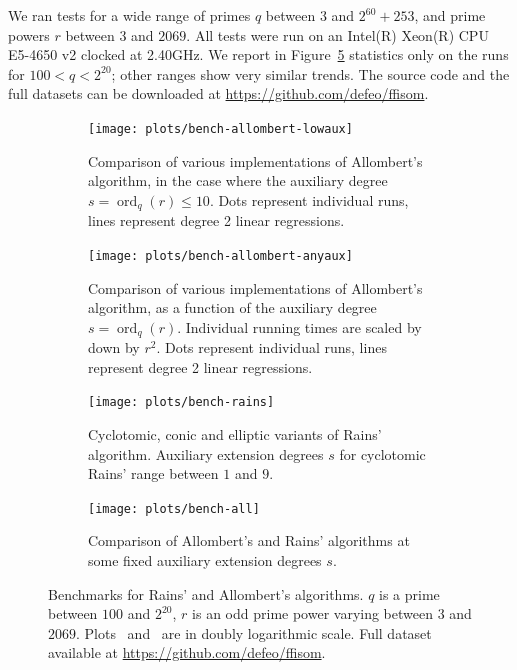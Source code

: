 \documentclass[12pt]{article}
\theoremstyle{plain}
\theoremstyle{definition}
\DeclareMathOperator{\order}{ord} %
\newcounter{algorithm}
\begin{document}
We ran tests for a wide range of primes $q$ between $3$ and
$2^{60}+253$, and prime powers $r$ between $3$ and $2069$. All tests
were run on an
Intel(R) Xeon(R) CPU E5-4650 v2 clocked at 2.40GHz.
We report in Figure~\ref{fig:bench} statistics only on the runs for
$100<q<2^{20}$; other ranges show very similar trends. The source
code and the full datasets can be downloaded at
\url{https://github.com/defeo/ffisom}.

\begin{figure}
  \newlength{\mywidth}
  \setlength{\mywidth}{8cm}
  \centering

  \begin{subfigure}{.48\textwidth}
    \texttt{[image: plots/bench-allombert-lowaux]}
    \caption{Comparison of various implementations of Allombert's
      algorithm, in the case where the auxiliary degree
      $s=\order_q(r)\le 10$.  Dots represent individual runs, lines
      represent degree 2 linear regressions.}
    \label{fig:bench:allombert-lowaux}
  \end{subfigure}
  \hfill
  \begin{subfigure}{.48\textwidth}
    \noindent
    \texttt{[image: plots/bench-allombert-anyaux]}
    \caption{Comparison of various implementations of Allombert's
      algorithm, as a function of the auxiliary degree
      $s=\order_q(r)$.  Individual running times are scaled by down by
      $r^2$.  Dots represent individual runs, lines represent degree 2
      linear regressions.}
    \label{fig:bench:allombert-anyaux}
  \end{subfigure}

  \begin{subfigure}{.48\textwidth}
    \noindent
    \texttt{[image: plots/bench-rains]}
    \caption{Cyclotomic, conic and elliptic variants of Rains'
      algorithm.  Auxiliary extension degrees $s$ for cyclotomic
      Rains' range between $1$ and $9$.}
    \label{fig:bench:rains}
  \end{subfigure}
  \hfill
  \begin{subfigure}{.48\textwidth}
    \noindent
    \texttt{[image: plots/bench-all]}
    \caption{Comparison of Allombert's and Rains' algorithms at some
      fixed auxiliary extension degrees $s$.}
    \label{fig:bench:all}
  \end{subfigure}

  \caption{Benchmarks for Rains' and Allombert's algorithms. $q$ is a
    prime between $100$ and $2^{20}$, $r$ is an odd prime power
    varying between $3$ and $2069$.  Plots~
    and~ are in doubly logarithmic scale. Full
    dataset available at \url{https://github.com/defeo/ffisom}.}
  \label{fig:bench}
\end{figure}
\end{document}
